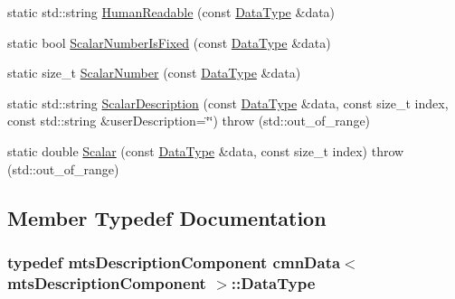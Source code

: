 \begin{DoxyCompactItemize}
\item 
static std\+::string \hyperlink{classcmn_data_3_01mts_description_component_01_4_a88c644a8faaae981d6022c3f49fc9ca8}{Human\+Readable} (const \hyperlink{classcmn_data_3_01mts_description_component_01_4_a5b51d26c4705dfe39a45243a2a4023dc}{Data\+Type} \&data)
\item 
static bool \hyperlink{classcmn_data_3_01mts_description_component_01_4_aaddf12ff6b535a9956ba1302147c38e4}{Scalar\+Number\+Is\+Fixed} (const \hyperlink{classcmn_data_3_01mts_description_component_01_4_a5b51d26c4705dfe39a45243a2a4023dc}{Data\+Type} \&data)
\item 
static size\+\_\+t \hyperlink{classcmn_data_3_01mts_description_component_01_4_af743501c375275321e68858d5fb948b4}{Scalar\+Number} (const \hyperlink{classcmn_data_3_01mts_description_component_01_4_a5b51d26c4705dfe39a45243a2a4023dc}{Data\+Type} \&data)
\item 
static std\+::string \hyperlink{classcmn_data_3_01mts_description_component_01_4_aecd6f8ffa46d9dfb7e64c053ee3c3c0e}{Scalar\+Description} (const \hyperlink{classcmn_data_3_01mts_description_component_01_4_a5b51d26c4705dfe39a45243a2a4023dc}{Data\+Type} \&data, const size\+\_\+t index, const std\+::string \&user\+Description=\char`\"{}\char`\"{})  throw (std\+::out\+\_\+of\+\_\+range)
\item 
static double \hyperlink{classcmn_data_3_01mts_description_component_01_4_a844ebabfa4cfc58e964c42a2fcf308c6}{Scalar} (const \hyperlink{classcmn_data_3_01mts_description_component_01_4_a5b51d26c4705dfe39a45243a2a4023dc}{Data\+Type} \&data, const size\+\_\+t index)  throw (std\+::out\+\_\+of\+\_\+range)
\end{DoxyCompactItemize}


\subsection{Member Typedef Documentation}
\hypertarget{classcmn_data_3_01mts_description_component_01_4_a5b51d26c4705dfe39a45243a2a4023dc}{}
\subsubsection[{Data\+Type}]{\setlength{\rightskip}{0pt plus 5cm}typedef {\bf mts\+Description\+Component} {\bf cmn\+Data}$<$ {\bf mts\+Description\+Component} $>$\+::{\bf Data\+Type}}\label{classcmn_data_3_01mts_description_component_01_4_a5b51d26c4705dfe39a45243a2a4023dc}



